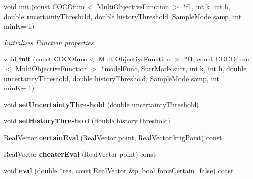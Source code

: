 \begin{DoxyCompactItemize}
\item 
void \hyperlink{classUncertainFunc_a19b36c606e6e0e6bb7fec851ff2a0f8e}{init} (const \hyperlink{classCOCOfunc}{C\+O\+C\+Ofunc}$<$ Multi\+Objective\+Function $>$ $\ast$f1, \hyperlink{classint}{int} k, \hyperlink{classint}{int} h, \hyperlink{classdouble}{double} uncertainty\+Threshold, \hyperlink{classdouble}{double} history\+Threshold, Sample\+Mode samp, \hyperlink{classint}{int} minK=-\/1)
\begin{DoxyCompactList}\small\item\em Initialises Function properties. \end{DoxyCompactList}\item 
void {\bfseries init} (const \hyperlink{classCOCOfunc}{C\+O\+C\+Ofunc}$<$ Multi\+Objective\+Function $>$ $\ast$f1, const \hyperlink{classCOCOfunc}{C\+O\+C\+Ofunc}$<$ Multi\+Objective\+Function $>$ $\ast$model\+Func, Surr\+Mode surr, \hyperlink{classint}{int} k, \hyperlink{classint}{int} h, \hyperlink{classdouble}{double} uncertainty\+Threshold, \hyperlink{classdouble}{double} history\+Threshold, Sample\+Mode samp, \hyperlink{classint}{int} minK=-\/1)\hypertarget{classUncertainFunc_aa9793decff59b54e743c1fb1af58166a}{}\label{classUncertainFunc_aa9793decff59b54e743c1fb1af58166a}

\item 
void {\bfseries set\+Uncertainty\+Threshold} (\hyperlink{classdouble}{double} uncertainty\+Threshold)\hypertarget{classUncertainFunc_ac85e8f24d6a94afc53d90213ca0aec6e}{}\label{classUncertainFunc_ac85e8f24d6a94afc53d90213ca0aec6e}

\item 
void {\bfseries set\+History\+Threshold} (\hyperlink{classdouble}{double} history\+Threshold)\hypertarget{classUncertainFunc_aca5c5df4e4cd7f0a89ea33651091d8c0}{}\label{classUncertainFunc_aca5c5df4e4cd7f0a89ea33651091d8c0}

\item 
Real\+Vector {\bfseries certain\+Eval} (Real\+Vector point, Real\+Vector krig\+Point) const\hypertarget{classUncertainFunc_ac85c9fadbc1b5d5da80ce143eed764af}{}\label{classUncertainFunc_ac85c9fadbc1b5d5da80ce143eed764af}

\item 
Real\+Vector {\bfseries cheater\+Eval} (Real\+Vector point) const\hypertarget{classUncertainFunc_a5646bc2bda8db6b975eda4d681510733}{}\label{classUncertainFunc_a5646bc2bda8db6b975eda4d681510733}

\item 
void {\bfseries eval} (\hyperlink{classdouble}{double} $\ast$res, const Real\+Vector \&p, \hyperlink{classbool}{bool} force\+Certain=false) const\hypertarget{classUncertainFunc_a15bea4023bd717aa81a986e8d7b144bf}{}\label{classUncertainFunc_a15bea4023bd717aa81a986e8d7b144bf}


\end{DoxyCompactItemize}
